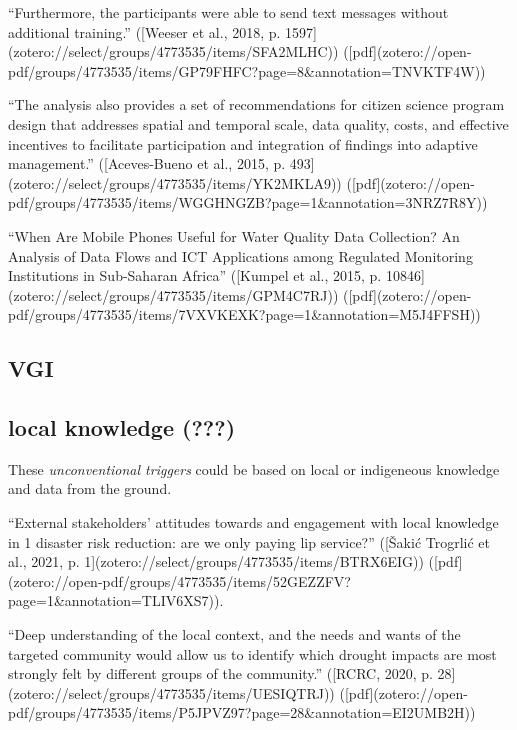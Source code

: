 {“Furthermore, the participants were able to send text messages without additional training.” ([Weeser et al., 2018, p. 1597](zotero://select/groups/4773535/items/SFA2MLHC)) ([pdf](zotero://open-pdf/groups/4773535/items/GP79FHFC?page=8&annotation=TNVKTF4W))

“The analysis also provides a set of recommendations for citizen science program design that addresses spatial and temporal scale, data quality, costs, and effective incentives to facilitate participation and integration of findings into adaptive management.” ([Aceves-Bueno et al., 2015, p. 493](zotero://select/groups/4773535/items/YK2MKLA9)) ([pdf](zotero://open-pdf/groups/4773535/items/WGGHNGZB?page=1&annotation=3NRZ7R8Y))

“When Are Mobile Phones Useful for Water Quality Data Collection? An Analysis of Data Flows and ICT Applications among Regulated Monitoring Institutions in Sub-Saharan Africa” ([Kumpel et al., 2015, p. 10846](zotero://select/groups/4773535/items/GPM4C7RJ)) ([pdf](zotero://open-pdf/groups/4773535/items/7VXVKEXK?page=1&annotation=M5J4FFSH))




\subsection{VGI} %



\subsection{local knowledge (???)} %
These \textit{unconventional triggers} could be based on local or indigeneous knowledge and data from the ground.

“External stakeholders’ attitudes towards and engagement with local knowledge in 1 disaster risk reduction: are we only paying lip service?” ([Šakić Trogrlić et al., 2021, p. 1](zotero://select/groups/4773535/items/BTRX6EIG)) ([pdf](zotero://open-pdf/groups/4773535/items/52GEZZFV?page=1&annotation=TLIV6XS7)). 

“Deep understanding of the local context, and the needs and wants of the targeted community would allow us to identify which drought impacts are most strongly felt by different groups of the community.” ([RCRC, 2020, p. 28](zotero://select/groups/4773535/items/UESIQTRJ)) ([pdf](zotero://open-pdf/groups/4773535/items/P5JPVZ97?page=28&annotation=EI2UMB2H))

}
